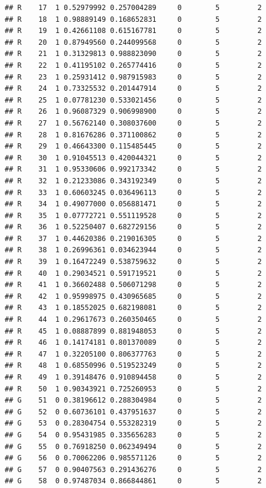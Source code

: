 \documentclass{article}\usepackage[]{graphicx}\usepackage[]{color}
\makeatletter
\newenvironment{kframe}{%
 \def\at@end@of@kframe{}%
 \ifinner\ifhmode%
  \def\at@end@of@kframe{\end{minipage}}%
  \begin{minipage}{\columnwidth}%
 \fi\fi%
 \def\FrameCommand##1{\hskip\@totalleftmargin \hskip-\fboxsep
 \colorbox{shadecolor}{##1}\hskip-\fboxsep
     \hskip-\linewidth \hskip-\@totalleftmargin \hskip\columnwidth}%
 \MakeFramed {\advance\hsize-\width
   \@totalleftmargin\z@ \linewidth\hsize
   \@setminipage}}%
 {\par\unskip\endMakeFramed%
 \at@end@of@kframe}
\newenvironment{knitrout}{}{} %
\makeatother
\begin{document}
\begin{knitrout}
\begin{kframe}
\begin{verbatim}
## R    17  1 0.52979992 0.257004289     0        5         2
## R    18  1 0.98889149 0.168652831     0        5         2
## R    19  1 0.42661108 0.615167781     0        5         2
## R    20  1 0.87949560 0.244099568     0        5         2
## R    21  1 0.31329813 0.988823090     0        5         2
## R    22  1 0.41195102 0.265774416     0        5         2
## R    23  1 0.25931412 0.987915983     0        5         2
## R    24  1 0.73325532 0.201447914     0        5         2
## R    25  1 0.07781230 0.533021456     0        5         2
## R    26  1 0.96087329 0.906998900     0        5         2
## R    27  1 0.56762140 0.308037600     0        5         2
## R    28  1 0.81676286 0.371100862     0        5         2
## R    29  1 0.46643300 0.115485445     0        5         2
## R    30  1 0.91045513 0.420044321     0        5         2
## R    31  1 0.95330606 0.992173342     0        5         2
## R    32  1 0.21233086 0.343192349     0        5         2
## R    33  1 0.60603245 0.036496113     0        5         2
## R    34  1 0.49077000 0.056881471     0        5         2
## R    35  1 0.07772721 0.551119528     0        5         2
## R    36  1 0.52250407 0.682729156     0        5         2
## R    37  1 0.44620386 0.219016305     0        5         2
## R    38  1 0.26996361 0.034623944     0        5         2
## R    39  1 0.16472249 0.538759632     0        5         2
## R    40  1 0.29034521 0.591719521     0        5         2
## R    41  1 0.36602488 0.506071298     0        5         2
## R    42  1 0.95998975 0.430965685     0        5         2
## R    43  1 0.18552025 0.682198081     0        5         2
## R    44  1 0.29617673 0.260350465     0        5         2
## R    45  1 0.08887899 0.881948053     0        5         2
## R    46  1 0.14174181 0.801370089     0        5         2
## R    47  1 0.32205100 0.806377763     0        5         2
## R    48  1 0.68550996 0.519523249     0        5         2
## R    49  1 0.39148476 0.910894458     0        5         2
## R    50  1 0.90343921 0.725260953     0        5         2
## G    51  0 0.38196612 0.288304984     0        5         2
## G    52  0 0.60736101 0.437951637     0        5         2
## G    53  0 0.28304754 0.553282319     0        5         2
## G    54  0 0.95431985 0.335656283     0        5         2
## G    55  0 0.76918250 0.062349494     0        5         2
## G    56  0 0.70062206 0.985571126     0        5         2
## G    57  0 0.90407563 0.291436276     0        5         2
## G    58  0 0.97487034 0.866844861     0        5         2

\end{verbatim}
\end{kframe}
\end{knitrout}
\end{document}
